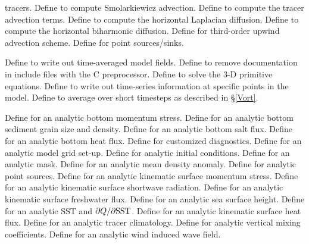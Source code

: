\begin{klist}
\begin{klist}
  tracers.
     Define to compute
  Smolarkiewicz advection.
          Define to compute the tracer
  advection terms.
         Define to compute the
  horizontal Laplacian diffusion.
         Define to compute the
  horizontal biharmonic diffusion.
     Define for third-order upwind advection scheme.
     Define for point sources/sinks.
  \end{klist}
   \mbox{}
  \begin{klist}
        Define to write out time-averaged
  model fields.
        Define to remove documentation in
  include files with the C preprocessor.
         Define to solve the 3-D primitive
  equations.
        Define to write out time-series
  information at specific points in the model.
       Define to average over short
  timesteps as described in \S\ref{Vort}.
  \end{klist}
   \mbox{}
  \begin{klist}
      Define for an analytic bottom momentum stress.
      Define for an analytic  bottom sediment grain
  size and density.
      Define for an analytic bottom salt flux.
      Define for an analytic bottom heat flux.
        Define for customized diagnostics.
        Define for an analytic model grid set-up.
     Define for analytic initial conditions.
        Define for an analytic mask.
     Define for an analytic mean density anomaly.
     Define for analytic point sources.
      Define for an analytic kinematic surface
  momentum stress.
      Define for an analytic kinematic surface
  shortwave radiation.
      Define for an analytic kinematic surface
  freshwater flux.
      Define for an analytic sea surface height.
      Define for an analytic SST and
  $\partial Q /\partial {\rm SST}$.
      Define for an analytic kinematic surface
  heat flux.
      Define for an analytic tracer climatology.
        Define for analytic vertical mixing
  coefficients.
       Define for an analytic wind induced wave
  field.
  \end{klist}

\end{klist}
